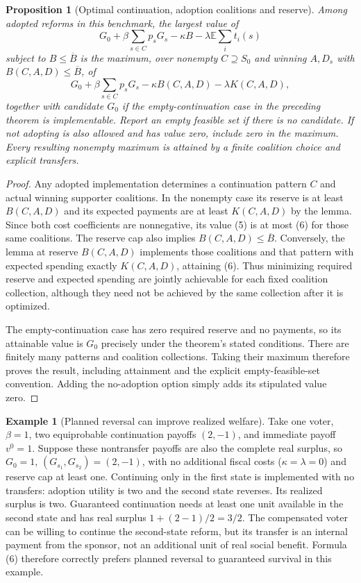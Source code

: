 \documentclass[11pt]{article}
\newtheorem{proposition}{Proposition}
\theoremstyle{definition}
\newtheorem{example}{Example}
\begin{document}
\begin{proposition}[Optimal continuation, adoption coalitions and reserve]
Among adopted reforms in this benchmark, the largest value of
\[
 G_0+\beta\sum_{s\in C}p_sG_s
      -\kappa B-\lambda\mathbb E\sum_i t_i(s)                 \tag{5}
\]
subject to $B\leq\overline B$ is the maximum, over nonempty
$C\supseteq S_0$ and winning $A,D_s$ with
$B(C,A,D)\leq\overline B$, of
\[
 G_0+\beta\sum_{s\in C}p_sG_s
      -\kappa B(C,A,D)-\lambda K(C,A,D),                     \tag{6}
\]
together with candidate $G_0$ if the empty-continuation case in the
preceding theorem is implementable. Report an empty feasible set if
there is no candidate. If not adopting is also allowed and has value
zero, include zero in the maximum. Every resulting nonempty maximum
is attained by a finite coalition choice and explicit transfers.
\end{proposition}
\begin{proof}
Any adopted implementation determines a continuation pattern $C$ and
actual winning supporter coalitions. In the nonempty case its reserve
is at least $B(C,A,D)$ and its expected payments are at least
$K(C,A,D)$ by the lemma. Since both cost coefficients are nonnegative,
its value (5) is at most (6) for those same coalitions. The reserve cap
also implies $B(C,A,D)\leq\overline B$. Conversely, the lemma at
reserve $B(C,A,D)$ implements those coalitions and that pattern with
expected spending exactly $K(C,A,D)$, attaining (6). Thus minimizing
required reserve and expected spending are jointly achievable for each
fixed coalition collection, although they need not be achieved by the
same collection after it is optimized.

The empty-continuation case has zero required reserve and no payments,
so its attainable value is $G_0$ precisely under the theorem's stated
conditions. There are finitely many patterns and coalition collections.
Taking their maximum therefore proves the result, including attainment
and the explicit empty-feasible-set convention. Adding the no-adoption
option simply adds its stipulated value zero.
\end{proof}

\begin{example}[Planned reversal can improve realized welfare]
Take one voter, $\beta=1$, two equiprobable continuation payoffs
$(2,-1)$, and immediate payoff $v^0=1$. Suppose these nontransfer
payoffs are also the complete real surplus, so $G_0=1$,
$(G_{s_1},G_{s_2})=(2,-1)$, with no additional fiscal costs
($\kappa=\lambda=0$) and reserve cap at least one. Continuing only
in the first state is implemented with no transfers: adoption utility
is two and the second state reverses. Its realized surplus is two.
Guaranteed continuation needs at least one unit available in the
second state and has real surplus $1+(2-1)/2=3/2$. The compensated
voter can be willing to continue the second-state reform, but its
transfer is an internal payment from the sponsor, not an additional
unit of real social benefit. Formula (6) therefore correctly prefers
planned reversal to guaranteed survival in this example.
\end{example}
\end{document}
